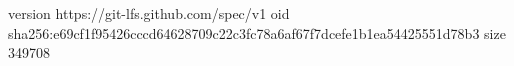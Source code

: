 version https://git-lfs.github.com/spec/v1
oid sha256:e69cf1f95426cccd64628709c22c3fc78a6af67f7dcefe1b1ea54425551d78b3
size 349708
